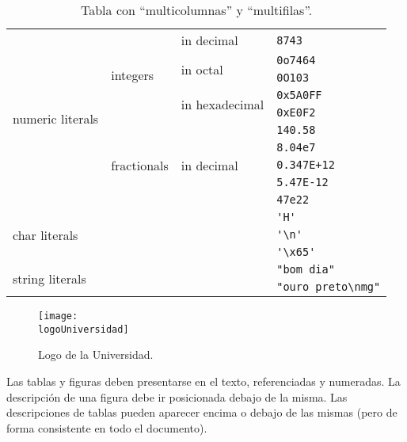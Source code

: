 \documentclass[12pt,twoside,titlepage]{report}
\newcommand{\logoUniversidad}{logoURJC.pdf} %
\begin{document}
\begin{table}
  \centering

\begin{small}
\begin{tabular}{|l|l|l|l|}\hline
  \multirow{10}{*}{numeric literals} & \multirow{5}{*}{integers} & in decimal & \verb|8743| \\ \cline{3-4}
  & & \multirow{2}{*}{in octal} & \verb|0o7464| \\ \cline{4-4}
  & & & \verb|0O103| \\ \cline{3-4}
  & & \multirow{2}{*}{in hexadecimal} & \verb|0x5A0FF| \\ \cline{4-4}
  & & & \verb|0xE0F2| \\ \cline{2-4}
  & \multirow{5}{*}{fractionals} & \multirow{5}{*}{in decimal} & \verb|140.58| \\ \cline{4-4}
  & & & \verb|8.04e7| \\ \cline{4-4}
  & & & \verb|0.347E+12| \\ \cline{4-4}
  & & & \verb|5.47E-12| \\ \cline{4-4}
  & & & \verb|47e22| \\ \cline{1-4}
  \multicolumn{3}{|l|}{\multirow{3}{*}{char literals}} & \verb|'H'| \\ \cline{4-4}
  \multicolumn{3}{|l|}{} & \verb|'\n'| \\ \cline{4-4}          %
  \multicolumn{3}{|l|}{} & \verb|'\x65'| \\ \cline{1-4}        %
  \multicolumn{3}{|l|}{\multirow{2}{*}{string literals}} & \verb|"bom dia"| \\ \cline{4-4}
  \multicolumn{3}{|l|}{} & \verb|"ouro preto\nmg"| \\ \cline{1-4}          %
\end{tabular}
\end{small}

  \caption{Tabla con ``multicolumnas'' y ``multifilas''.}\label{tab:tablacompleja}
\end{table}





\begin{figure}
  \centering
  \texttt{[image: \\logoUniversidad]}
  \caption{Logo de la Universidad.}
  \label{fig:logo_universidad}
\end{figure}

Las tablas y figuras deben presentarse en el texto, referenciadas y numeradas. La descripción de una figura debe ir posicionada debajo de la misma. Las descripciones de tablas pueden aparecer encima o debajo de las mismas (pero de forma consistente en todo el documento).
\end{document}
